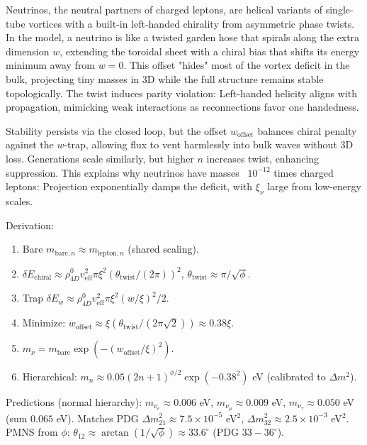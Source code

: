 Neutrinos, the neutral partners of charged leptons, are helical variants of single-tube vortices with a built-in left-handed chirality from asymmetric phase twists. In the model, a neutrino is like a twisted garden hose that spirals along the extra dimension $w$, extending the toroidal sheet with a chiral bias that shifts its energy minimum away from $w=0$. This offset "hides" most of the vortex deficit in the bulk, projecting tiny masses in 3D while the full structure remains stable topologically. The twist induces parity violation: Left-handed helicity aligns with propagation, mimicking weak interactions as reconnections favor one handedness.

Stability persists via the closed loop, but the offset $w_{\text{offset}}$ balances chiral penalty against the $w$-trap, allowing flux to vent harmlessly into bulk waves without 3D loss. Generations scale similarly, but higher $n$ increases twist, enhancing suppression. This explains why neutrinos have masses ~$10^{-12}$ times charged leptons: Projection exponentially damps the deficit, with $\xi_{\nu}$ large from low-energy scales.

Derivation:
\begin{enumerate}
    \item Bare $m_{\text{bare},n} \approx m_{\text{lepton},n}$ (shared scaling).
    \item $\delta E_{\text{chiral}} \approx \rho_{4D}^0 v_{\text{eff}}^2 \pi \xi^2 (\theta_{\text{twist}} / (2\pi))^2$, $\theta_{\text{twist}} \approx \pi / \sqrt{\phi}$.
    \item Trap $\delta E_w \approx \rho_{4D}^0 v_{\text{eff}}^2 \pi \xi^2 (w / \xi)^2 / 2$.
    \item Minimize: $w_{\text{offset}} \approx \xi (\theta_{\text{twist}} / (2\pi \sqrt{2})) \approx 0.38 \xi$.
    \item $m_\nu = m_{\text{bare}} \exp( - (w_{\text{offset}} / \xi)^2 )$.
    \item Hierarchical: $m_n \approx 0.05 (2n+1)^{\phi/2} \exp(-0.38^2)$ eV (calibrated to $\Delta m^2$).
\end{enumerate}

Predictions (normal hierarchy): $m_{\nu_e} \approx 0.006$ eV, $m_{\nu_\mu} \approx 0.009$ eV, $m_{\nu_\tau} \approx 0.050$ eV (sum $0.065$ eV). Matches PDG $\Delta m^2_{21} \approx 7.5 \times 10^{-5}$ eV$^2$, $\Delta m^2_{32} \approx 2.5 \times 10^{-3}$ eV$^2$. PMNS from $\phi$: $\theta_{12} \approx \arctan(1/\sqrt{\phi}) \approx 33.6^\circ$ (PDG $33-36^\circ$).

